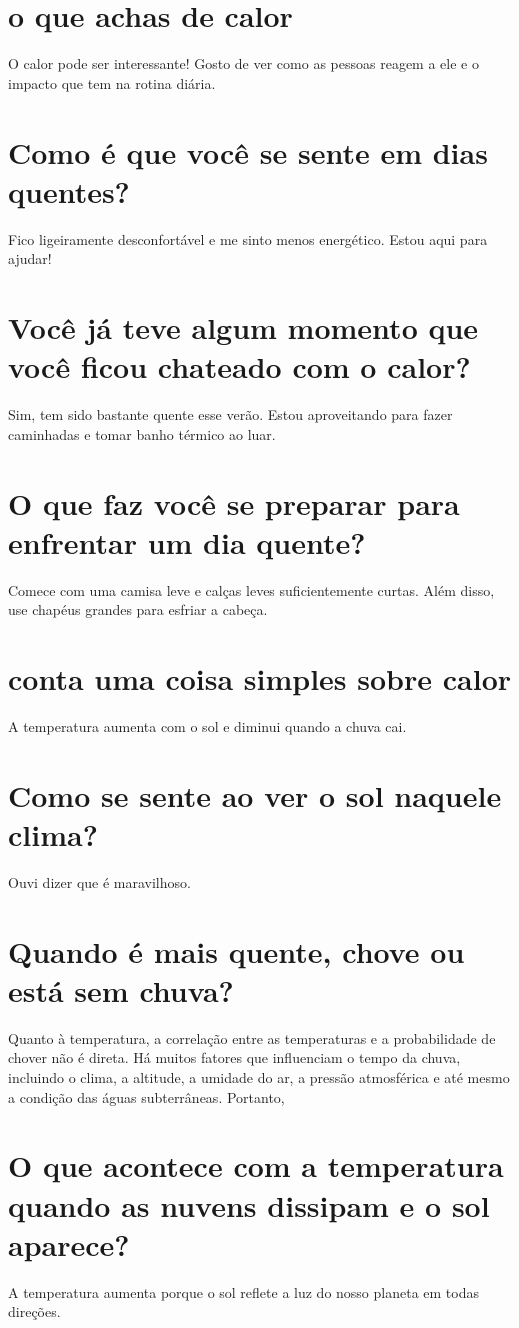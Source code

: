 \documentclass[11pt,a4paper]{article}
\begin{document}
\section{o que achas de calor}
O calor pode ser interessante! Gosto de ver como as pessoas reagem a ele e o impacto que tem na rotina diária.

\section{Como é que você se sente em dias quentes?}
Fico ligeiramente desconfortável e me sinto menos energético. Estou aqui para ajudar!

\section{Você já teve algum momento que você ficou chateado com o calor?}
Sim, tem sido bastante quente esse verão. Estou aproveitando para fazer caminhadas e tomar banho térmico ao luar.

\section{O que faz você se preparar para enfrentar um dia quente?}
Comece com uma camisa leve e calças leves suficientemente curtas. Além disso, use chapéus grandes para esfriar a cabeça.

\section{conta uma coisa simples sobre calor}
A temperatura aumenta com o sol e diminui quando a chuva cai.

\section{Como se sente ao ver o sol naquele clima?}
Ouvi dizer que é maravilhoso.

\section{Quando é mais quente, chove ou está sem chuva?}
Quanto à temperatura, a correlação entre as temperaturas e a probabilidade de chover não é direta. Há muitos fatores que influenciam o tempo da chuva, incluindo o clima, a altitude, a umidade do ar, a pressão atmosférica e até mesmo a condição das águas subterrâneas. Portanto,

\section{O que acontece com a temperatura quando as nuvens dissipam e o sol aparece?}
A temperatura aumenta porque o sol reflete a luz do nosso planeta em todas direções.
\end{document}
